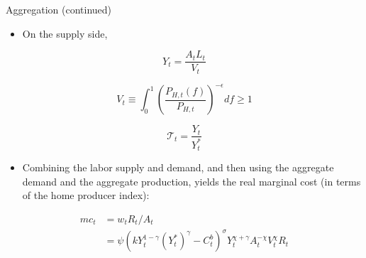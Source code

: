 \documentclass[10pt]{beamer}
\begin{document}
\begin{frame}{Aggregation (continued)}

\begin{itemize}
    \item On the supply side,
\end{itemize}

$$
Y_{t}=\frac{A_{t} L_{t}}{V_{t}}
$$

$$
V_{t} \equiv \int_{0}^{1}\left(\frac{P_{H, t}(f)}{P_{H, t}}\right)^{-\epsilon} d f \geq 1
$$

$$
\mathcal{T}_{t}=\frac{Y_{t}}{Y_{t}^{*}}
$$

\begin{itemize}
    \item Combining the labor supply and demand, and then using the aggregate demand and the aggregate production, yields the real marginal cost (in terms of the home producer index):
\end{itemize}


$$
\begin{aligned}
m c_{t} & =w_{t}R_{t} / A_{t} \\
& =\psi\left(k Y_{t}^{1-\gamma}\left(Y_{t}^{*}\right)^{\gamma}-C_{t}^{b}\right)^{\sigma} Y_{t}^{\chi+\gamma} A_{t}^{-\chi} V_{t}^{\chi}R_{t}
\end{aligned}
$$  
\end{frame}
    
\end{document}
